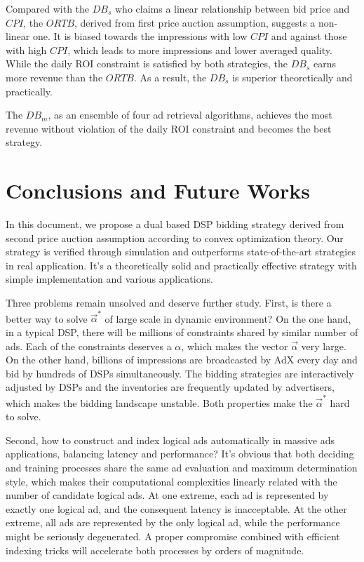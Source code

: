 \documentclass[sigconf]{acmart}
\newcommand{\valpha}{\vec{\alpha}}
\begin{document}
Compared with the $DB_s$ who claims a linear relationship between bid price and $CPI$,
    the $ORTB$, derived from first price auction assumption, suggests a non-linear one.
It is biased towards the impressions with low $CPI$ and against those with high $CPI$,
    which leads to more impressions and lower averaged quality.
While the daily ROI constraint is satisfied by both strategies,
    the $DB_s$ earns more revenue than the $ORTB$. As a result, the $DB_s$ is superior theoretically and practically.

The $DB_m$, as an ensemble of four ad retrieval algorithms,
    achieves the most revenue without violation of the daily ROI constraint and becomes the best strategy.

\section{Conclusions and Future Works}

In this document, we propose a dual based DSP bidding strategy
    derived from second price auction assumption according to convex optimization theory.
Our strategy is verified through simulation and outperforms state-of-the-art strategies in real application.
It's a theoretically solid and practically effective strategy with simple implementation and various applications.

Three problems remain unsolved and deserve further study.
First, is there a better way to solve $\valpha^*$ of large scale in dynamic environment?
On the one hand, in a typical DSP, there will be millions of constraints shared by similar number of ads.
Each of the constraints deserves a $\alpha$, which makes the vector $\valpha$ very large.
On the other hand, billions of impressions are broadcasted by AdX every day and bid by hundreds of DSPs simultaneously.
The bidding strategies are interactively adjusted by DSPs and the inventories are frequently updated by advertisers,
    which makes the bidding landscape unstable.
Both properties make the $\valpha^*$ hard to solve.

Second, how to construct and index logical ads automatically in massive ads applications, balancing latency and performance?
It's obvious that both deciding and training processes share the same ad evaluation and maximum determination style,
    which makes their computational complexities linearly related with the number of candidate logical ads.
At one extreme, each ad is represented by exactly one logical ad, and the consequent latency is inacceptable.
At the other extreme, all ads are represented by the only logical ad, while the performance might be seriously degenerated.
A proper compromise combined with efficient indexing tricks will accelerate both processes by orders of magnitude.
\end{document}
